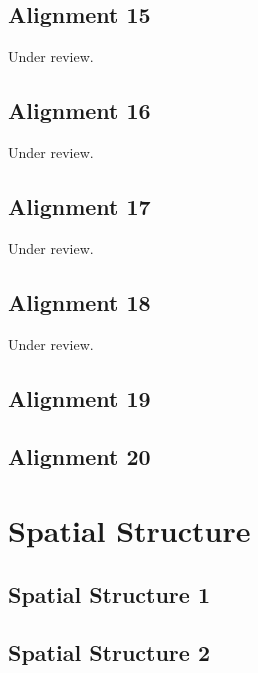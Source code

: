 \documentclass{scrartcl}
\begin{document}
\subsection{Alignment 15} %
\label{sec:align_15}
Under review.%
\clearpage

\subsection{Alignment 16} %
\label{sec:align_16}
Under review.%
\clearpage

\subsection{Alignment 17} %
\label{sec:align_17}
Under review.%
\clearpage

\subsection{Alignment 18} %
\label{sec:align_18}
Under review.%
\clearpage

\subsection{Alignment 19} %
\label{sec:align_19}
\clearpage

\subsection{Alignment 20} %
\label{sec:align_20}
\clearpage

\section{Spatial Structure}

\subsection{Spatial Structure 1}
\label{sec:spatial_1}
\clearpage

\subsection{Spatial Structure 2}
\label{sec:spatial_2}
\clearpage
\end{document}

